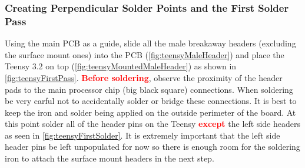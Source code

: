 \subsubsection{Creating Perpendicular Solder Points and the First Solder Pass}
\label{sec:teensyFirstSolder}

Using the main PCB as a guide, slide all the male breakaway headers (excluding the surface mount ones) into the PCB (\cref{fig:teensyMaleHeader}) and place the Teensy 3.2 on top (\cref{fig:teensyMountedMaleHeader}) as shown in \cref{fig:teensyFirstPass}. \textbf{\textcolor{red}{Before soldering}}, observe the proximity of the header pads to the main processor chip (big black square) connections. When soldering be very carful not to accidentally solder or bridge these connections. It is best to keep the iron and solder being applied on the outside perimeter of the board. At this point solder all of the header pins on the Teensy {\textcolor{red}{\textbf{except}}} the left side headers as seen in \cref{fig:teensyFirstSolder}. It is extremely important that the left side header pins be left unpopulated for now so there is enough room for the soldering iron to attach the surface mount headers in the next step.

